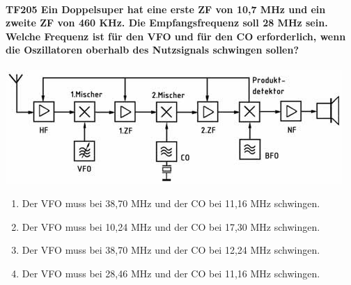 \documentclass[8pt]{article}
\begin{document}
\begin{enumerate}
\paragraph*{TF205 Ein Doppelsuper hat eine erste ZF von 10,7 MHz und ein zweite ZF von 460 KHz. Die Empfangsfrequenz soll 28 MHz sein. Welche Frequenz ist für den VFO und für den CO erforderlich, wenn die Oszillatoren oberhalb des Nutzsignals schwingen sollen?}
\begin{center}
	\begin{minipage}{\linewidth}
		\centering
		\includegraphics[scale=1.0]{pics/tf205_a.jpg}
	\end{minipage}
\end{center}
\begin{enumerate}[nolistsep,label=\Alph*]
\item Der VFO muss bei 38,70 MHz und der CO bei 11,16 MHz schwingen.
\item Der VFO muss bei 10,24 MHz und der CO bei 17,30 MHz schwingen.
\item Der VFO muss bei 38,70 MHz und der CO bei 12,24 MHz schwingen.
\item Der VFO muss bei 28,46 MHz und der CO bei 11,16 MHz schwingen.
\end{enumerate}


\end{enumerate}
\end{document}
